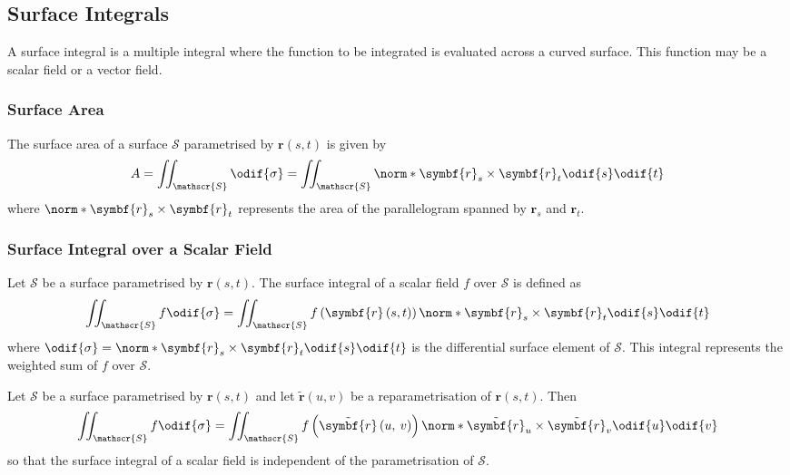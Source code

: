 \documentclass{article}
\begin{document}
\subsection{Surface Integrals}
A surface integral is a multiple integral where the function to be
integrated is evaluated across a curved surface. This function may be a
scalar field or a vector field.
\subsubsection{Surface Area}
The surface area of a surface \(\mathscr{S}\) parametrised by
\(\symbf{r}\left( s, t \right)\) is given by
\begin{equation*}
    A = \iint_{\mathscr{S}} \odif{\sigma} = \iint_{\mathscr{S}} \norm*{\symbf{r}_s \times \symbf{r}_t} \odif{s} \odif{t}
\end{equation*}
where \(\norm*{\symbf{r}_s \times \symbf{r}_t}\) represents the area of
the parallelogram spanned by \(\symbf{r}_s\) and \(\symbf{r}_t\).
\subsubsection{Surface Integral over a Scalar Field}
Let \(\mathscr{S}\) be a surface parametrised by \(\symbf{r}\left( s, t
\right)\). The surface integral of a scalar field \(f\) over
\(\mathscr{S}\) is defined as
\begin{equation*}
    \iint_{\mathscr{S}} f \odif{\sigma} = \iint_{\mathscr{S}} f\left( \symbf{r}\left( s, t \right) \right) \norm*{\symbf{r}_s \times \symbf{r}_t} \odif{s} \odif{t}
\end{equation*}
where \(\odif{\sigma} = \norm*{\symbf{r}_s \times \symbf{r}_t} \odif{s}\odif{t}\)
is the differential surface element of \(\mathscr{S}\).
This integral represents the weighted sum of \(f\) over \(\mathscr{S}\).
\begin{lemma}
    Let \(\mathscr{S}\) be a surface parametrised by \(\symbf{r}\left( s, t \right)\)
    and let \(\tilde{\symbf{r}}\left( u, v \right)\) be a reparametrisation
    of \(\symbf{r}\left( s, t \right)\). Then
    \begin{equation*}
        \iint_{\mathscr{S}} f \odif{\sigma} = \iint_{\mathscr{S}} f\left( \tilde{\symbf{r}}\left( u,\: v \right) \right) \norm*{\tilde{\symbf{r}}_u \times \tilde{\symbf{r}}_v} \odif{u} \odif{v}
    \end{equation*}
    so that the surface integral of a scalar field is independent of the
    parametrisation of \(\mathscr{S}\).
\end{lemma}
\end{document}
